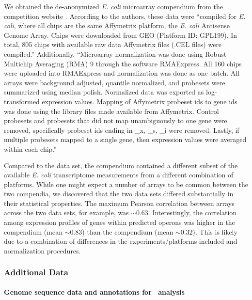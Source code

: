We obtained the de-anonymized {\it E. coli} microarray compendium from the  competition website \cite{marbach_wisdom_2012}. According to the authors, these data were ``compiled for {\it E. coli}, where all chips are the same Affymetrix platform, the \textit{E. coli} Antisense Genome Array. Chips were downloaded from GEO (Platform ID: GPL199). In total, 805 chips with available raw data Affymetrix files (.CEL files) were compiled.''  Additionally, ``Microarray normalization was done using Robust Multichip Averaging (RMA) 9 through the software RMAExpress. All 160 chips were uploaded into RMAExpress and normalization was done as one batch. All arrays were background adjusted, quantile normalized, and probesets were summarized using median polish. Normalized data was exported as log-transformed expression values. Mapping of Affymetrix probeset ids to gene ids was done using the library files made available from Affymetrix. Control probesets and probesets that did not map unambiguously to one gene were removed, specifically probeset ids ending in \_x, \_s, \_i were removed. Lastly, if multiple probesets mapped to a single gene, then expression values were averaged within each chip.''

Compared to the  \cite{lemmens_distiller:_2009} data set, the  \cite{marbach_wisdom_2012} compendium contained a different subset of the available \textit{E. coli} transcriptome measurements from a different combination of platforms. While one might expect a number of arrays to be common between the two compendia, we discovered that the two data sets differed substantially in their statistical properties. The maximum Pearson correlation between arrays across the two data sets, for example, was $\sim 0.63$. Interestingly, the correlation among expression profiles of genes within predicted operons \cite{price_novel_2005} was higher in the  compendium (mean $\sim 0.83$) than the  compendium (mean $\sim 0.32$). This is likely due to a combination of differences in the experiments/platforms included and normalization procedures.

\subsubsection{Additional Data}

\paragraph{Genome sequence data and annotations for \cm~analysis}

